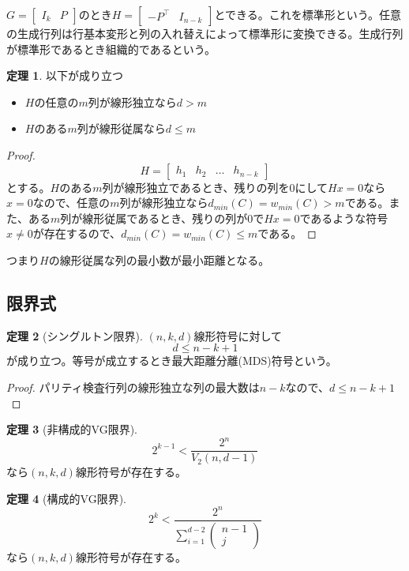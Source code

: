 \documentclass{jsarticle}
\renewcommand{\(}{\left(}
\renewcommand{\)}{\right)}
\theoremstyle{definition}
\newtheorem{thm}{定理}
\begin{document}
$G = \begin{bmatrix} I_k & P \end{bmatrix}$のとき$H = \begin{bmatrix} -P^\top & I_{n-k} \end{bmatrix}$とできる。これを標準形という。任意の生成行列は行基本変形と列の入れ替えによって標準形に変換できる。生成行列が標準形であるとき組織的であるという。

\begin{thm}
    以下が成り立つ
    \begin{itemize}
        \item $H$の任意の$m$列が線形独立なら$d > m$
        \item $H$のある$m$列が線形従属なら$d \leq m$
    \end{itemize}
\end{thm}
\begin{proof}
        \[H = \begin{bmatrix} h_1 & h_2 & \dots & h_{n-k} \end{bmatrix}\]
    とする。$H$のある$m$列が線形独立であるとき、残りの列を0にして$Hx = 0$なら$x = 0$なので、任意の$m$列が線形独立なら$d_{min}(C) = w_{min}(C) > m$である。また、ある$m$列が線形従属であるとき、残りの列が0で$Hx = 0$であるような符号$x \neq 0$が存在するので、$d_{min}(C) = w_{min}(C) \leq m$である。
\end{proof}
つまり$H$の線形従属な列の最小数が最小距離となる。

\subsection{限界式}

\begin{thm}[シングルトン限界]
    $(n, k, d)$線形符号に対して
        \[d \leq n - k + 1\]
    が成り立つ。等号が成立するとき最大距離分離(MDS)符号という。
\end{thm}
\begin{proof}
    パリティ検査行列の線形独立な列の最大数は$n - k$なので、$d \leq n - k + 1$
\end{proof}

\begin{thm}[非構成的VG限界]
        \[2^{k-1} < \frac{2^n}{V_2(n, d-1)}\]
    なら$(n, k, d)$線形符号が存在する。
\end{thm}

\begin{thm}[構成的VG限界]
        \[2^k < \frac{2^n}{\sum_{i=1}^{d-2} \begin{pmatrix} n-1\\ j \end{pmatrix}}\]
    なら$(n, k, d)$線形符号が存在する。
\end{thm}
\end{document}
